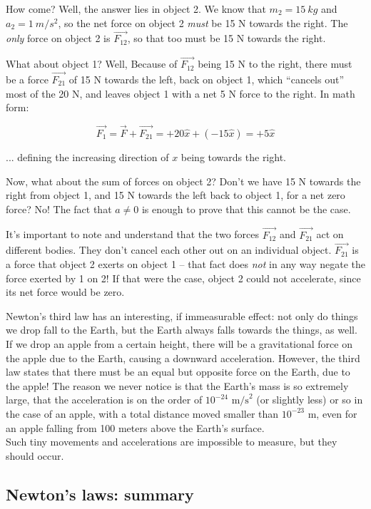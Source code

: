 How come? Well, the answer lies in object 2. We know that $m_2 = \SI{15}{kg}$ and $a_2 = \SI{1}{m/s^2}$, so the net force on object 2 \emph{must} be 15 N towards the right. The \emph{only} force on object 2 is $\vec{F_{12}}$, so that too must be 15 N towards the right.

What about object 1? Well, Because of $\vec{F_{12}}$ being 15 N to the right, there must be a force $\vec{F_{21}}$ of 15 N towards the left, back on object 1, which ``cancels out'' most of the 20 N, and leaves object 1 with a net 5 N force to the right. In math form:

\begin{equation}
\vec{F_1} = \vec{F} + \vec{F_{21}} = +20\hat{x} + (-15\hat{x}) = +5 \hat{x}
\end{equation}

... defining the increasing direction of $x$ being towards the right.

Now, what about the sum of forces on object 2? Don't we have 15 N towards the right from object 1, and 15 N towards the left back to object 1, for a net zero force? No! The fact that $a \neq 0$ is enough to prove that this cannot be the case.

It's important to note and understand that the two forces $\vec{F_{12}}$ and $\vec{F_{21}}$ act on different bodies. They don't cancel each other out on an individual object. $\vec{F_{21}}$ is a force that object 2 exerts on object 1 -- that fact does \emph{not} in any way negate the force exerted by 1 on 2! If that were the case, object 2 could not accelerate, since its net force would be zero.

Newton's third law has an interesting, if immeasurable effect: not only do things we drop fall to the Earth, but the Earth always falls towards the things, as well. If we drop an apple from a certain height, there will be a gravitational force on the apple due to the Earth, causing a downward acceleration. However, the third law states that there must be an equal but opposite force on the Earth, due to the apple! The reason we never notice is that the Earth's mass is so extremely large, that the acceleration is on the order of $10^{-24} \text{ m/s}^2$ (or slightly less) or so in the case of an apple, with a total distance moved smaller than $10^{-23}$ m, even for an apple falling from 100 meters above the Earth's surface.\\
Such tiny movements and accelerations are impossible to measure, but they should occur.


\subsection{Newton's laws: summary}

